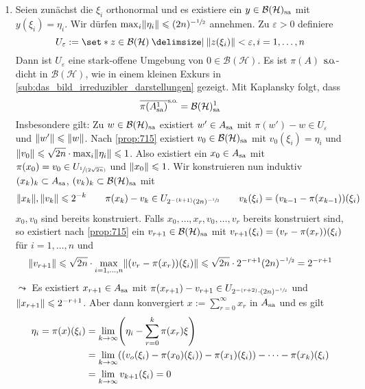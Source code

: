 \begin{beweis}
	\begin{enumerate}[1.]
		\item Seien zunächst die $\xi_i$ orthonormal und es existiere ein $y \in \mathcal{B}(\mathcal{H})_\sa$ mit $y(\xi_i)=\eta_i$.
		Wir dürfen $\max_i \norm*{\eta_i} \le (2n)^{- \sfrac{1}{2}}$ annehmen.
		Zu $\varepsilon>0$ definiere
		\[
			U_\varepsilon := \set*{z \in \mathcal{B}(\mathcal{H}) \given \norm*{z(\xi_i)} < \varepsilon , i=1,\ldots ,n}
		\]
		Dann ist $U_\varepsilon$ eine stark-offene Umgebung von $0 \in \mathcal{B}(\mathcal{H})$.
		Es ist $\pi(A)$ $\so$-dicht in $\mathcal{B}(\mathcal{H})$, wie in einem kleinen Exkurs in \cref{sub:das_bild_irreduzibler_darstellungen} gezeigt.
		Mit Kaplansky folgt, dass 
		\[
			\overline{\pi(A_\sa^1)}^\so = \mathcal{B}(\mathcal{H})_\sa^1
		\]
		Insbesondere gilt:
		Zu $w \in \mathcal{B}(\mathcal{H})_\sa$ existiert $w' \in A_\sa$ mit $\pi(w')-w \in U_\varepsilon$ und $\norm*{w'} \le \norm*{w}$.
		Nach \autoref{prop:715} existiert $v_0 \in \mathcal{B}(\mathcal{H})_\sa$ mit $v_0(\xi_i)=\eta_i$ und $\norm*{v_0} \le \sqrt{2n} \cdot \max_i \norm*{\eta_i} \le 1$.
		Also existiert ein $x_0 \in A_\sa$ mit $\pi(x_0)=v_0 \in U_{\sfrac{1}{(2 \sqrt{2n})}}$ und $\norm*{x_0} \le 1$.
		Wir konstruieren nun induktiv $(x_k)_k \subset A_\sa$, $(v_k)_k \subset \mathcal{B}(\mathcal{H})_\sa$ mit 
		\[
			\norm*{x_k}, \norm*{v_k} \le 2^{-k} \qquad \pi(x_k) -v_k \in U_{2^{-(k+1)} (2n)^{- \sfrac{1}{2}}} \qquad v_k(\xi_i) = \enbrace*{v_{k-1} - \pi(x_{k-1})}(\xi_i)
		\]
		$x_0, v_0$ sind bereits konstruiert.
		Falls $x_0, \ldots ,x_r, v_0, \ldots ,v_r$ bereits konstruiert sind, so existiert nach \autoref{prop:715} ein $v_{r+1} \in \mathcal{B}(\mathcal{H})_\sa$ mit 
		$v_{r+1}(\xi_i)= \enbrace*{v_r- \pi(x_r)}(\xi_i)$ für $i=1,\ldots ,n$ und 
		\[
			\norm*{v_{r+1}} \le \sqrt{2n} \cdot \max_{i=1,\ldots ,n} \norm*{\enbrace*{v_r - \pi(x_r)}(\xi_i)} \le \sqrt{2n} \cdot 2^{-{r+1}} (2n)^{- \sfrac{1}{2}} = 2^{-{r+1}}
		\]
		$\leadsto$ Es existiert $x_{r+1} \in A_\sa$ mit $\pi(x_{r+1}) - v_{r+1} \in U_{2^{-(r+2)} \cdot (2n)^{-\sfrac{1}{2}}}$ und $\norm*{x_{r+1}} \le 2^{-{r+1}}$.
		Aber dann konvergiert $x := \sum_{r=0}^{\infty} x_r$ in $A_\sa$ und es gilt
		\begin{align}
			\eta_i = \pi(x)(\xi_i) 
			&= \lim_{k \to \infty} \enbrace*{\eta_i - \sum_{r=0}^{k} \pi(x_r) \xi}\\ 
			&= \lim_{k \to \infty} \enbrace*{ \enbrace*{v_o(\xi_i) - \pi(x_0)(\xi_i)} - \pi(x_1)(\xi_i)} - \cdots - \pi(x_k)(\xi_i) \\
			&= \lim_{k  \to \infty} v_{k+1}(\xi_i) =0
		\end{align}
	\end{enumerate}
\end{beweis}











